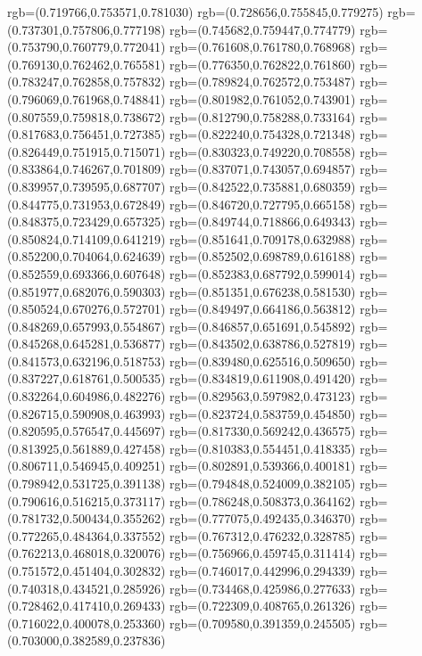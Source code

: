 {{{			rgb=(0.719766,0.753571,0.781030)
			rgb=(0.728656,0.755845,0.779275)
			rgb=(0.737301,0.757806,0.777198)
			rgb=(0.745682,0.759447,0.774779)
			rgb=(0.753790,0.760779,0.772041)
			rgb=(0.761608,0.761780,0.768968)
			rgb=(0.769130,0.762462,0.765581)
			rgb=(0.776350,0.762822,0.761860)
			rgb=(0.783247,0.762858,0.757832)
			rgb=(0.789824,0.762572,0.753487)
			rgb=(0.796069,0.761968,0.748841)
			rgb=(0.801982,0.761052,0.743901)
			rgb=(0.807559,0.759818,0.738672)
			rgb=(0.812790,0.758288,0.733164)
			rgb=(0.817683,0.756451,0.727385)
			rgb=(0.822240,0.754328,0.721348)
			rgb=(0.826449,0.751915,0.715071)
			rgb=(0.830323,0.749220,0.708558)
			rgb=(0.833864,0.746267,0.701809)
			rgb=(0.837071,0.743057,0.694857)
			rgb=(0.839957,0.739595,0.687707)
			rgb=(0.842522,0.735881,0.680359)
			rgb=(0.844775,0.731953,0.672849)
			rgb=(0.846720,0.727795,0.665158)
			rgb=(0.848375,0.723429,0.657325)
			rgb=(0.849744,0.718866,0.649343)
			rgb=(0.850824,0.714109,0.641219)
			rgb=(0.851641,0.709178,0.632988)
			rgb=(0.852200,0.704064,0.624639)
			rgb=(0.852502,0.698789,0.616188)
			rgb=(0.852559,0.693366,0.607648)
			rgb=(0.852383,0.687792,0.599014)
			rgb=(0.851977,0.682076,0.590303)
			rgb=(0.851351,0.676238,0.581530)
			rgb=(0.850524,0.670276,0.572701)
			rgb=(0.849497,0.664186,0.563812)
			rgb=(0.848269,0.657993,0.554867)
			rgb=(0.846857,0.651691,0.545892)
			rgb=(0.845268,0.645281,0.536877)
			rgb=(0.843502,0.638786,0.527819)
			rgb=(0.841573,0.632196,0.518753)
			rgb=(0.839480,0.625516,0.509650)
			rgb=(0.837227,0.618761,0.500535)
			rgb=(0.834819,0.611908,0.491420)
			rgb=(0.832264,0.604986,0.482276)
			rgb=(0.829563,0.597982,0.473123)
			rgb=(0.826715,0.590908,0.463993)
			rgb=(0.823724,0.583759,0.454850)
			rgb=(0.820595,0.576547,0.445697)
			rgb=(0.817330,0.569242,0.436575)
			rgb=(0.813925,0.561889,0.427458)
			rgb=(0.810383,0.554451,0.418335)
			rgb=(0.806711,0.546945,0.409251)
			rgb=(0.802891,0.539366,0.400181)
			rgb=(0.798942,0.531725,0.391138)
			rgb=(0.794848,0.524009,0.382105)
			rgb=(0.790616,0.516215,0.373117)
			rgb=(0.786248,0.508373,0.364162)
			rgb=(0.781732,0.500434,0.355262)
			rgb=(0.777075,0.492435,0.346370)
			rgb=(0.772265,0.484364,0.337552)
			rgb=(0.767312,0.476232,0.328785)
			rgb=(0.762213,0.468018,0.320076)
			rgb=(0.756966,0.459745,0.311414)
			rgb=(0.751572,0.451404,0.302832)
			rgb=(0.746017,0.442996,0.294339)
			rgb=(0.740318,0.434521,0.285926)
			rgb=(0.734468,0.425986,0.277633)
			rgb=(0.728462,0.417410,0.269433)
			rgb=(0.722309,0.408765,0.261326)
			rgb=(0.716022,0.400078,0.253360)
			rgb=(0.709580,0.391359,0.245505)
			rgb=(0.703000,0.382589,0.237836)
}}}
